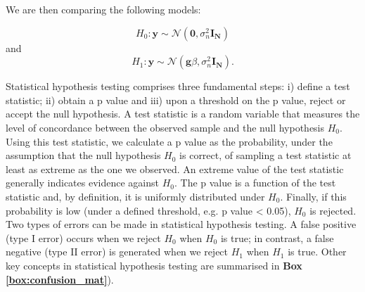 \vspace{4mm}

We are then comparing the following models:

\begin{equation}\label{eq:null_hypothesis_regression}
 H_0: \mathbf{y} \sim \mathcal{N}(\mathbf{0}, \sigma_n^{2} \mathbf{I_N}) 
\end{equation}
and
\begin{equation}\label{eq:alternative_hypothesis_regression}
 H_1: \mathbf{y} \sim \mathcal{N}(\mathbf{g}\beta,\sigma_n^{2} \mathbf{I_N}). 
\end{equation}

\vspace{4mm}

Statistical hypothesis testing comprises three fundamental steps: i) define a test statistic; ii) obtain a p value and iii) upon a threshold on the p value, reject or accept the null hypothesis. 
A test statistic is a random variable that measures the level of concordance between the observed sample and the null hypothesis $H_0$. 
Using this test statistic, we calculate a p value as the probability, under the assumption that the null hypothesis $H_0$ is correct, of sampling a test statistic at least as extreme as the one we observed. 
An extreme value of the test statistic generally indicates evidence against $H_0$.
The p value is a function of the test statistic and, by definition, it is uniformly distributed under $H_0$.
Finally, if this probability is low (under a defined threshold, e.g. p value < 0.05), $H_0$ is rejected.\\

Two types of errors can be made in statistical hypothesis testing. 
A false positive (type I error) occurs when we reject $H_0$ when $H_0$ is true; in contrast, a false negative (type II error) is generated when we reject $H_1$ when $H_1$ is true.
Other key concepts in statistical hypothesis testing are summarised in \textbf{Box \ref{box:confusion_mat}}).


\newpage

